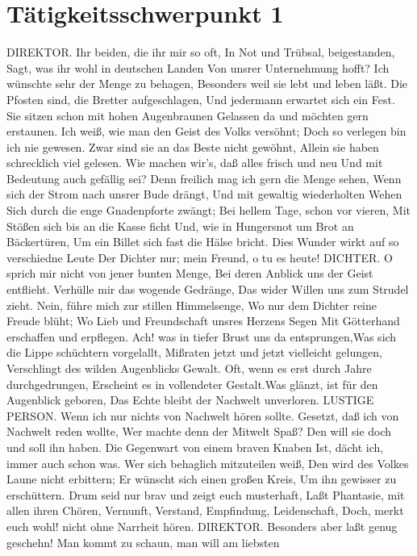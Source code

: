 \chapter{Tätigkeitsschwerpunkt 1}
\label{cha:Tätigkeitsschwerpunkt 1}

DIREKTOR. Ihr beiden, die ihr mir so oft, In Not und Trübsal, beigestanden, Sagt, was ihr
wohl in deutschen Landen Von unsrer Unternehmung hofft? Ich wünschte sehr der Menge zu
behagen, Besonders weil sie lebt und leben läßt. Die Pfosten sind, die Bretter aufgeschlagen,
Und jedermann erwartet sich ein Fest. Sie sitzen schon mit hohen Augenbraunen Gelassen
da und möchten gern erstaunen. Ich weiß, wie man den Geist des Volks versöhnt; Doch so
verlegen bin ich nie gewesen. Zwar sind sie an das Beste nicht gewöhnt, Allein sie haben
schrecklich viel gelesen. Wie machen wir’s, daß alles frisch und neu Und mit Bedeutung
auch gefällig sei? Denn freilich mag ich gern die Menge sehen, Wenn sich der Strom nach
unsrer Bude drängt, Und mit gewaltig wiederholten Wehen Sich durch die enge Gnadenpforte
zwängt; Bei hellem Tage, schon vor vieren, Mit Stößen sich bis an die Kasse ficht Und, wie
in Hungersnot um Brot an Bäckertüren, Um ein Billet sich fast die Hälse bricht. Dies Wunder
wirkt auf so verschiedne Leute Der Dichter nur; mein Freund, o tu es heute!
DICHTER. O sprich mir nicht von jener bunten Menge, Bei deren Anblick uns der Geist
entflieht. Verhülle mir das wogende Gedränge, Das wider Willen uns zum Strudel zieht. Nein,
führe mich zur stillen Himmelsenge, Wo nur dem Dichter reine Freude blüht; Wo Lieb und
Freundschaft unsres Herzens Segen Mit Götterhand erschaffen und erpflegen.
Ach! was in tiefer Brust uns da entsprungen,Was sich die Lippe schüchtern vorgelallt, Mißraten
jetzt und jetzt vielleicht gelungen, Verschlingt des wilden Augenblicks Gewalt. Oft, wenn
es erst durch Jahre durchgedrungen, Erscheint es in vollendeter Gestalt.Was glänzt, ist für den
Augenblick geboren, Das Echte bleibt der Nachwelt unverloren.
LUSTIGE PERSON. Wenn ich nur nichts von Nachwelt hören sollte. Gesetzt, daß ich von
Nachwelt reden wollte, Wer machte denn der Mitwelt Spaß? Den will sie doch und soll ihn
haben. Die Gegenwart von einem braven Knaben Ist, dächt ich, immer auch schon was. Wer sich behaglich mitzuteilen weiß, Den wird des Volkes Laune nicht erbittern; Er wünscht sich
einen großen Kreis, Um ihn gewisser zu erschüttern. Drum seid nur brav und zeigt euch musterhaft,
Laßt Phantasie, mit allen ihren Chören, Vernunft, Verstand, Empfindung, Leidenschaft,
Doch, merkt euch wohl! nicht ohne Narrheit hören.
DIREKTOR. Besonders aber laßt genug geschehn! Man kommt zu schaun, man will am liebsten
